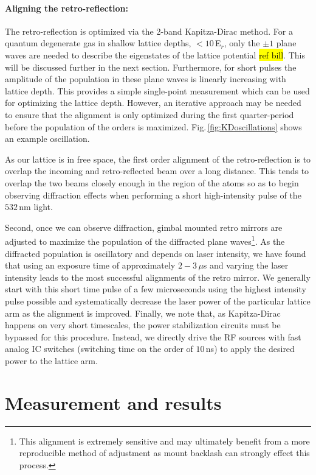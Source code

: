 \paragraph{Aligning the retro-reflection:}
The retro-reflection is optimized via the 2-band Kapitza-Dirac method.
For a quantum degenerate gas in shallow lattice depths, $<10$\,E$_r$, only the $\pm1$ plane waves are needed to describe the eigenstates of the lattice potential \hl{ref bill}.
This will be discussed further in the next section.
Furthermore, for short pulses the amplitude of the population in these plane waves is linearly increasing with lattice depth.
This provides a simple single-point measurement which can be used for optimizing the lattice depth.
However, an iterative approach may be needed to ensure that the alignment is only optimized during the first quarter-period before the population of the orders is maximized.
Fig.\,\ref{fig:KDoscillations} shows an example oscillation.

As our lattice is in free space, the first order alignment of the retro-reflection is to overlap the incoming and retro-reflected beam over a long distance.
This tends to overlap the two beams closely enough in the region of the atoms so as to begin observing diffraction effects when performing a short high-intensity pulse of the $532$\,nm light.

Second, once we can observe diffraction, gimbal mounted retro mirrors are adjusted to maximize the population of the diffracted plane waves\footnote{This alignment is extremely sensitive and may ultimately benefit from a more reproducible method of adjustment as mount backlash can strongly effect this process.}.
As the diffracted population is oscillatory and depends on laser intensity, we have found that using an exposure time of approximately $2 - 3$\,$\mu$s and varying the laser intensity leads to the most successful alignments of the retro mirror.
We generally start with this short time pulse of a few microseconds using the highest intensity pulse possible and systematically decrease the laser power of the particular lattice arm as the alignment is improved.
Finally, we note that, as Kapitza-Dirac happens on very short timescales, the power stabilization circuits must be bypassed for this procedure.
Instead, we directly drive the RF sources with fast analog IC switches (switching time on the order of $10$\,ns) to apply the desired power to the lattice arm.

\section{Measurement and results}
